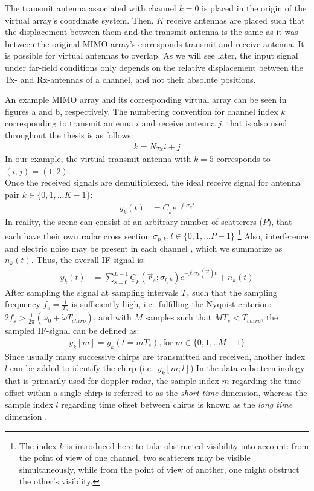 The transmit antenna associated with channel $k=0$ is placed in the origin of the virtual array's coordinate system.
Then, $K$ receive antennas are placed such that the displacement between them and the transmit antenna
is the same as it was between the original MIMO array's corresponds transmit and receive antenna.
It is possible for virtual antennas to overlap.
As we will see later, the input signal under far-field conditions only depends
on the relative displacement between the Tx- and Rx-antennas of a channel, and not their absolute positions.

An example MIMO array and its corresponding virtual array can be seen in figures a and b, respectively.
The numbering convention for channel index $k$ corresponding to transmit antenna $i$ and receive antenna $j$,
that is also used throughout the thesis is as follows:
\begin{align}
    k = N_{Tx}i + j \label{eqn:kij}
\end{align}
In our example, the virtual transmit antenna with $k=5$ corresponds to $(i,j)=(1,2)$. \\

Once the received signals are demultiplexed, the ideal receive signal for antenna pair $k \in \{0,1,...K-1\}$:
\begin{align}
    y_k(t) & = \underline C_k e^{-j\dot\omega\tau_k t} \label{eq:ideal_scatterer}
\end{align}
In reality, the scene can consist of an arbitrary number of scatterers ($P$),
that each have their own radar cross section $\sigma_{p,k}, l \in \{0,1,...P-1\}$
\footnote{
    The index $k$ is introduced here to take obstructed visibility into account:
    from the point of view of one channel, two scatterers may be visible simultaneously,
    while from the point of view of another, one might obstruct the other's visiblity.
}
Also, interference and electric noise may be present in each channel \parencite[see][ch. 4]{jankiraman},
which we summarize as $n_k(t)$. Thus, the overall IF-signal is:
\begin{align}
    y_k(t) & = \sum_{s=0}^{L-1} \underline C_k(\vec r_s; \sigma_{l,k}) e^{-j\dot\omega\tau_k(\vec r)t} + n_k(t)
\end{align}
After sampling the signal at sampling intervals $T_s$ such that the sampling frequency $f_s = \frac{1}{T_s}$
is sufficiently high, i.e.\ fulfilling the Nyquist criterion:
${2f_s > \frac{1}{2\pi}(\omega_0 + \dot \omega T_{chirp})}$, and with $M$ samples such that $MT_s < T_{chirp}$,
the sampled IF-signal can be defined as:
\begin{align}
    y_k[m] = y_k(t=mT_s), \text{for}\;m \in \{0,1,..M-1\}
\end{align}
Since usually many successive chirps are transmitted and received,
another index $l$ can be added to identify the chirp (i.e.\ $y_{k}[m;l]$)
In the data cube terminology that is primarily used for doppler radar,
the sample index $m$ regarding the time offset within a single chirp
is referred to as the \emph{short time} dimension,
whereas the sample index $l$ regarding time offset between chirps
is known as the \emph{long time} dimension \parencite[see][pp. 290f.]{richards}.

